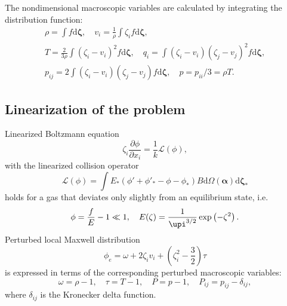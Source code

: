 \documentclass[final]{jfm} %
\newcommand{\dd}{\mathrm{d}}
\newcommand{\pder}[2][]{\frac{\partial#1}{\partial#2}}
\newcommand{\dzeta}{\boldsymbol{\dd\zeta}}
\begin{document}
The nondimensional macroscopic variables are calculated by integrating the distribution function:
\begin{equation}\label{eq:macro}
    \begin{gathered}
    \rho = \int f \dzeta, \quad
    v_i = \frac1{\rho} \int \zeta_i f \dzeta, \\
    T = \frac{2}{3\rho}\int(\zeta_i-v_i)^2 f \dzeta, \quad
    q_i = \int(\zeta_i-v_i)(\zeta_j-v_j)^2 f \dzeta, \\
    p_{ij} = 2 \int(\zeta_i-v_i)(\zeta_j-v_j) f \dzeta,
        \quad p = p_{ii}/3 = \rho T.
    \end{gathered}
\end{equation}

\subsection{Linearization of the problem}

Linearized Boltzmann equation
\begin{equation}\label{eq:linear_Boltzmann}
    \zeta_i \pder[\phi]{x_i} = \frac1k \mathcal{L}(\phi),
\end{equation}
with the linearized collision operator
\begin{equation}\label{eq:linear_ci}
    \mathcal{L}(\phi) = \int E_*(\phi'+\phi'_*-\phi-\phi_*) B
    \dd \Omega(\boldsymbol{\alpha}) \dzeta_*
\end{equation}
holds for a gas that deviates only slightly from an equilibrium state, i.e.
\begin{equation}\label{eq:linear_condition}
    \phi = \frac{f}{E} - 1 \ll 1, \quad E(\zeta) = \frac1{\upi^{3/2}}\exp\left(-\zeta^2\right).
\end{equation}
Perturbed local Maxwell distribution
\begin{equation}\label{eq:linear_maxwellian}
    \phi_e = \omega + 2\zeta_i v_i + \left(\zeta_i^2-\frac32\right)\tau
\end{equation}
is expressed in terms of the corresponding perturbed macroscopic variables:
\begin{equation}\label{eq:perturbed_variables}
    \omega = \rho-1, \quad \tau = T-1, \quad P = p-1, \quad P_{ij} = p_{ij}-\delta_{ij},
\end{equation}
where \(\delta_{ij}\) is the Kronecker delta function.
\end{document}
